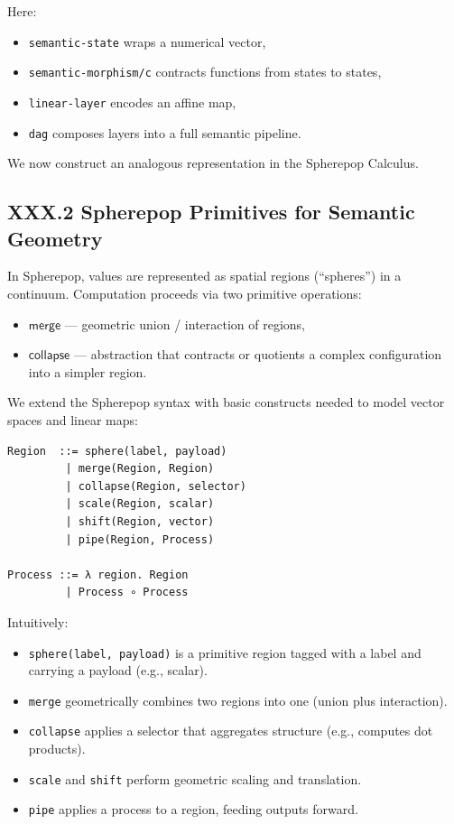 \documentclass[11pt,letterpaper]{article}
\begin{document}
Here:

\begin{itemize}
  \item \texttt{semantic-state} wraps a numerical vector,
  \item \texttt{semantic-morphism/c} contracts functions from states to states,
  \item \texttt{linear-layer} encodes an affine map,
  \item \texttt{dag} composes layers into a full semantic pipeline.
\end{itemize}

We now construct an analogous representation in the Spherepop Calculus.

\subsection{XXX.2 Spherepop Primitives for Semantic Geometry}

In Spherepop, values are represented as spatial regions (``spheres'') in a continuum. Computation proceeds via two primitive operations:

\begin{itemize}
  \item $\mathsf{merge}$ --- geometric union / interaction of regions,
  \item $\mathsf{collapse}$ --- abstraction that contracts or quotients a complex configuration into a simpler region.
\end{itemize}

We extend the Spherepop syntax with basic constructs needed to model vector spaces and linear maps:

\begin{verbatim}
Region  ::= sphere(label, payload)
         | merge(Region, Region)
         | collapse(Region, selector)
         | scale(Region, scalar)
         | shift(Region, vector)
         | pipe(Region, Process)

Process ::= λ region. Region
         | Process ∘ Process
\end{verbatim}

Intuitively:

\begin{itemize}
  \item \verb|sphere(label, payload)| is a primitive region tagged with a label and carrying a payload (e.g., scalar).
  \item \verb|merge| geometrically combines two regions into one (union plus interaction).
  \item \verb|collapse| applies a selector that aggregates structure (e.g., computes dot products).
  \item \verb|scale| and \verb|shift| perform geometric scaling and translation.
  \item \verb|pipe| applies a process to a region, feeding outputs forward.
\end{itemize}
\end{document}
